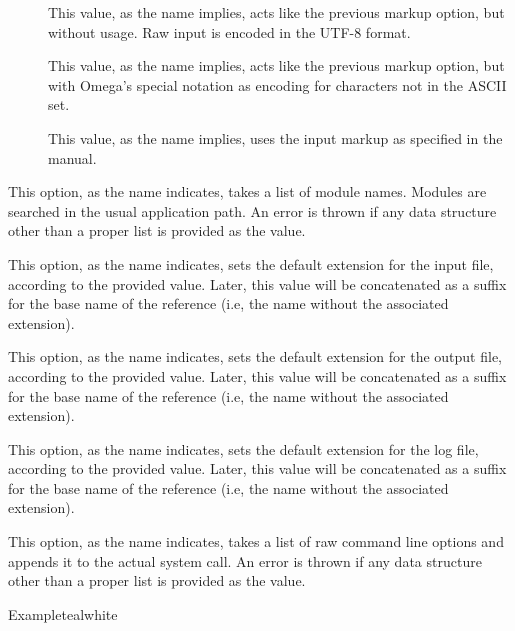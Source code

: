 \begin{description}
\begin{description}
\begin{description}
\item[] This value, as the name implies, acts like the previous  markup option, but without  usage. Raw input is encoded in the UTF-8 format.

\item[] This value, as the name implies, acts like the previous  markup option, but with Omega's special notation as encoding for characters not in the ASCII set.

\item[] This value, as the name implies, uses the  input markup as specified in the  manual.
\end{description}

\item[\abox{modules}] This option, as the name indicates, takes a list of module names. Modules are searched in the usual application path. An error is thrown if any data structure other than a proper list is provided as the value.

\item[\rpbox{input}{idx}] This option, as the name indicates, sets the default extension for the input file, according to the provided value. Later, this value will be concatenated as a suffix for the base name of the  reference (i.e, the name without the associated extension).

\item[\rpbox{output}{ind}] This option, as the name indicates, sets the default extension for the output file, according to the provided value. Later, this value will be concatenated as a suffix for the base name of the  reference (i.e, the name without the associated extension).

\item[\rpbox{log}{ilg}] This option, as the name indicates, sets the default extension for the log file, according to the provided value. Later, this value will be concatenated as a suffix for the base name of the  reference (i.e, the name without the associated extension).

\item[\abox{options}] This option, as the name indicates, takes a list of raw command line options and appends it to the actual system call. An error is thrown if any data structure other than a proper list is provided as the value.
\end{description}

\begin{codebox}{Example}{teal}{\icnote}{white}
\end{codebox}
\end{description}

